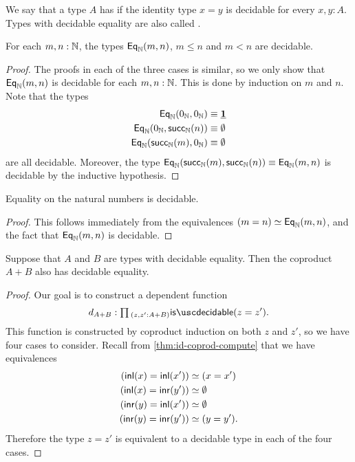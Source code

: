 \begin{defn}
  We say that a type $A$ has  if the identity type $x=y$ is decidable for every $x,y:A$. Types with decidable equality are also called .
\end{defn}

\begin{lem}
  For each $m,n:{\mathbb{N}}$, the types $\mathsf{Eq}_{{\mathbb{N}}}(m,n)$, $m\leq n$ and $m<n$ are decidable.
\end{lem}

\begin{proof}
  The proofs in each of the three cases is similar, so we only show that $\mathsf{Eq}_{{\mathbb{N}}}(m,n)$ is decidable for each $m,n:{\mathbb{N}}$. This is done by induction on $m$ and $n$. Note that the types
  \begin{align*}
    \mathsf{Eq}_{{\mathbb{N}}}(0_{{\mathbb{N}}},0_{{\mathbb{N}}}) & \equiv \underline{\mathbf{1}} \\
    \mathsf{Eq}_{{\mathbb{N}}}(0_{{\mathbb{N}}},\mathsf{succ}_{{\mathbb{N}}}(n)) & \equiv \emptyset \\
    \mathsf{Eq}_{{\mathbb{N}}}(\mathsf{succ}_{{\mathbb{N}}}(m),0_{{\mathbb{N}}}) & \equiv \emptyset 
  \end{align*}
  are all decidable. Moreover, the type $\mathsf{Eq}_{{\mathbb{N}}}(\mathsf{succ}_{{\mathbb{N}}}(m),\mathsf{succ}_{{\mathbb{N}}}(n))\equiv \mathsf{Eq}_{{\mathbb{N}}}(m,n)$ is decidable by the inductive hypothesis.
\end{proof}

\begin{cor}
  Equality on the natural numbers is decidable.
\end{cor}

\begin{proof}
  This follows immediately from the equivalences $(m=n)\simeq \mathsf{Eq}_{{\mathbb{N}}}(m,n)$, and the fact that $\mathsf{Eq}_{{\mathbb{N}}}(m,n)$ is decidable.
\end{proof}

\begin{lem}
  Suppose that $A$ and $B$ are types with decidable equality. Then the coproduct $A+B$ also has decidable equality.
\end{lem}

\begin{proof}
  Our goal is to construct a dependent function
  \begin{equation*}
    d_{A+B} : \prd{z,z':A+B}\isdecidable(z=z').
  \end{equation*}
  This function is constructed by coproduct induction on both $z$ and $z'$, so we have four cases to consider. Recall from \cref{thm:id-coprod-compute} that we have equivalences
  \begin{align*}
    ({\mathsf{inl}}(x)={\mathsf{inl}}(x')) & \simeq (x=x') \\
    ({\mathsf{inl}}(x)={\mathsf{inr}}(y')) & \simeq \emptyset \\
    ({\mathsf{inr}}(y)={\mathsf{inl}}(x')) & \simeq \emptyset \\
    ({\mathsf{inr}}(y)={\mathsf{inr}}(y')) & \simeq (y=y').
  \end{align*}
  Therefore the type $z=z'$ is equivalent to a decidable type in each of the four cases.
\end{proof}


